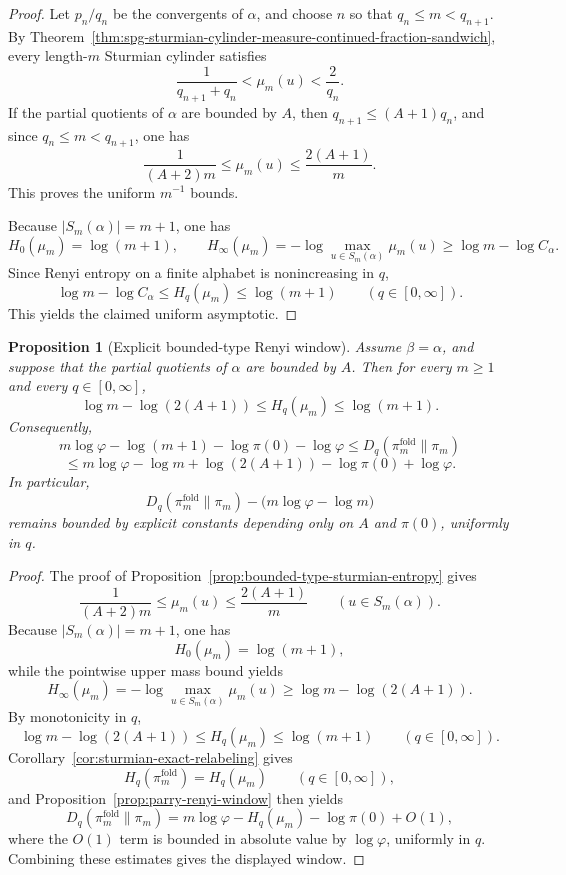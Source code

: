 \documentclass[11pt,letterpaper]{article}
\numberwithin{equation}{section}
\theoremstyle{plain}
\newtheorem{proposition}[theorem]{Proposition}
\theoremstyle{definition}
\theoremstyle{remark}
\begin{document}
\begin{proof}
Let \(p_n/q_n\) be the convergents of \(\alpha\), and choose \(n\) so that
\(q_n\le m<q_{n+1}\). By
Theorem~\ref{thm:spg-sturmian-cylinder-measure-continued-fraction-sandwich},
every length-\(m\) Sturmian cylinder satisfies
\[
\frac{1}{q_{n+1}+q_n}<\mu_m(u)<\frac{2}{q_n}.
\]
If the partial quotients of \(\alpha\) are bounded by \(A\), then
\(q_{n+1}\le (A+1)q_n\), and since \(q_n\le m<q_{n+1}\), one has
\[
\frac{1}{(A+2)m}\le \mu_m(u)\le \frac{2(A+1)}{m}.
\]
This proves the uniform \(m^{-1}\) bounds.

Because \(|S_m(\alpha)|=m+1\), one has
\[
H_0(\mu_m)=\log(m+1),
\qquad
H_\infty(\mu_m)=-\log\max_{u\in S_m(\alpha)}\mu_m(u)\ge \log m-\log C_\alpha.
\]
Since Renyi entropy on a finite alphabet is nonincreasing in \(q\),
\[
\log m-\log C_\alpha
\le
H_q(\mu_m)
\le
\log(m+1)
\qquad (q\in[0,\infty]).
\]
This yields the claimed uniform asymptotic.
\end{proof}

\begin{proposition}[Explicit bounded-type Renyi window]\label{prop:explicit-bounded-type-kl-window}
Assume \(\beta=\alpha\), and suppose that the partial quotients of \(\alpha\)
are bounded by \(A\). Then for every \(m\ge 1\) and every \(q\in[0,\infty]\),
\[
\log m-\log(2(A+1))
\le
H_q(\mu_m)
\le
\log(m+1).
\]
Consequently,
\[
m\log\varphi-\log(m+1)-\log\pi(0)-\log\varphi
\le
D_q(\pi_m^{\mathrm{fold}}\|\pi_m)
\]
\[
\le
m\log\varphi-\log m+\log(2(A+1))-\log\pi(0)+\log\varphi.
\]
In particular,
\[
D_q(\pi_m^{\mathrm{fold}}\|\pi_m)
-
\bigl(m\log\varphi-\log m\bigr)
\]
remains bounded by explicit constants depending only on \(A\) and \(\pi(0)\),
uniformly in \(q\).
\end{proposition}

\begin{proof}
The proof of Proposition~\ref{prop:bounded-type-sturmian-entropy} gives
\[
\frac{1}{(A+2)m}\le \mu_m(u)\le \frac{2(A+1)}{m}
\qquad (u\in S_m(\alpha)).
\]
Because \(|S_m(\alpha)|=m+1\), one has
\[
H_0(\mu_m)=\log(m+1),
\]
while the pointwise upper mass bound yields
\[
H_\infty(\mu_m)
=
-\log\max_{u\in S_m(\alpha)}\mu_m(u)
\ge
\log m-\log(2(A+1)).
\]
By monotonicity in \(q\),
\[
\log m-\log(2(A+1))
\le
H_q(\mu_m)
\le
\log(m+1)
\qquad (q\in[0,\infty]).
\]
Corollary~\ref{cor:sturmian-exact-relabeling} gives
\[
H_q(\pi_m^{\mathrm{fold}})=H_q(\mu_m)
\qquad (q\in[0,\infty]),
\]
and Proposition~\ref{prop:parry-renyi-window} then yields
\[
D_q(\pi_m^{\mathrm{fold}}\|\pi_m)
=
m\log\varphi-H_q(\mu_m)-\log\pi(0)+O(1),
\]
where the \(O(1)\) term is bounded in absolute value by \(\log\varphi\),
uniformly in \(q\). Combining these estimates gives the displayed window.
\end{proof}
\end{document}
